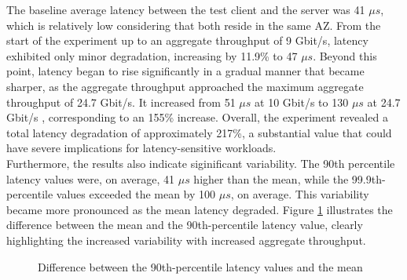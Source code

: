 \noindent
The baseline average latency between the test client and the server was 41 \(\mu s\), which is 
relatively low considering that both reside in the same \ac{AZ}. 
From the start of the experiment up to an aggregate throughput of 9 Gbit/s, latency exhibited 
only minor degradation, increasing by 11.9\% to 47 \(\mu s\).
Beyond this point, latency began to rise significantly in a gradual manner that became sharper,
as the aggregate throughput approached the maximum aggregate throughput of 24.7 Gbit/s. 
It increased from 51 \(\mu s\) at 10 Gbit/s to 130 \(\mu s\) at 24.7 Gbit/s , corresponding to an 155\%
increase. Overall, the experiment revealed a total latency degradation of approximately 217\%, 
a substantial value that could have severe implications for latency-sensitive workloads. \\ 
Furthermore, the results also indicate siginificant variability. 
The 90th percentile latency values were, on average, 41 \(\mu s\) higher than the 
mean, while the 99.9th-percentile values exceeded the mean by 100  \(\mu s\), on average. 
This variability became more pronounced as the mean latency degraded. Figure \ref{fig:sub} illustrates 
the difference between the mean and the 90th-percentile latency value, clearly highlighting 
the increased variability with increased aggregate throughput. 

\begin{figure}[H]
\caption{Difference between the 90th-percentile latency values and the mean}
\label{fig:sub}
\end{figure}
